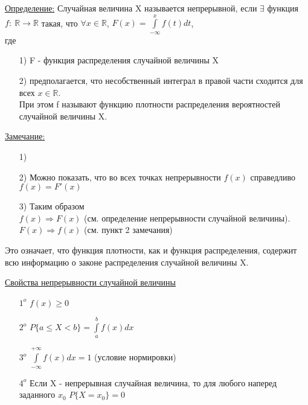 
\underline{Определение:} Случайная величина X называется непрерывной, если $\exists$ функция $f: \ \mathbb{R} \to \mathbb{R}$ такая, что $\forall x \in \mathbb{R}$, $\displaystyle  F(x) = \int\limits_{-\infty}^{x} f(t)dt$, \\
где 
\begin{enumerate}
\item[1)] F - функция распределения случайной величины X
\item[2)] предполагается, что несобственный интеграл в правой части сходится для всех $x \in \mathbb{R}$. \\
При этом f называют функцию плотности распределения вероятностей случайной величины X.
\end{enumerate}

\underline{Замечание:} 
\begin{enumerate}
\item[1)] %

\item[2)] Можно показать, что во всех точках непрерывности $f(x)$ справедливо $f(x) = F'(x)$

\item[3)] Таким образом \\
$f(x) \Rightarrow F(x)$ (см. определение непрерывности случайной величины). \\
$F(x) \Rightarrow f(x)$ (см. пункт 2 замечания)
\end{enumerate}
Это означает, что функция плотности, как и функция распределения, содержит всю информацию о законе распределения случайной величины X. 


\underline{Свойства непрерывности случайной величины} \\
\begin{enumerate}
\item[$1^o$] $f(x) \geqslant 0$ 
\item[$2^o$] $\displaystyle  P\{a \leqslant X < b\} = \int\limits_{a}^{b} f(x) dx$ 
\item[$3^o$] $\displaystyle  \int\limits_{-\infty}^{+\infty} f(x) dx = 1$ (условие нормировки)
\item[$4^o$] Если X - непрерывная случайная величина, то для любого наперед заданного $x_0$ $P\{X = x_0\} = 0$
\end{enumerate}


